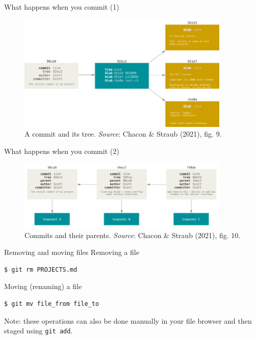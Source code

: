 \documentclass[handout]{beamer}
\begin{document}
\begin{frame}{What happens when you commit (1)}
	\begin{figure}
		\includegraphics[width=0.9\textwidth]{figures/fig09_commit.png}
		\caption{A commit and its tree. \textit{Source}: Chacon \& Straub (2021), fig. 9.}
	\end{figure}
\end{frame}

\begin{frame}{What happens when you commit (2)}
	\begin{figure}
		\includegraphics[width=0.9\textwidth]{figures/fig10_commits_parents.png}
		\caption{Commits and their parents. \textit{Source}: Chacon \& Straub (2021), fig. 10.}
	\end{figure}
\end{frame}

\begin{frame}[fragile]{Removing and moving files}
Removing a file
\begin{lstlisting}
$ git rm PROJECTS.md
\end{lstlisting}
Moving (renaming) a file
\begin{lstlisting}
$ git mv file_from file_to
\end{lstlisting}
Note: these operations can also be done manually in your file browser and then staged using \texttt{git add}.
\end{frame}
\end{document}
